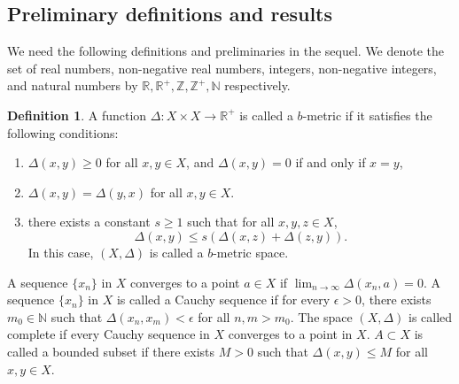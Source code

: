 \documentclass{birkjour}
\theoremstyle{definition}
\newtheorem{defn}[thm]{Definition}
\theoremstyle{remark}
\numberwithin{equation}{section}
\begin{document}
\subsection{Preliminary definitions and results}\label{pre-res}
We need the following definitions and preliminaries in the sequel. We denote the set of real numbers, non-negative real numbers, integers, non-negative integers, and natural numbers by $\mathbb{R},\mathbb{R}^{+}, \mathbb{Z}, \mathbb{Z}^{+}, \mathbb{N}$ respectively.\\  
\begin{defn}\label{metrics}
A function \(\Delta: X \times X \to \mathbb{R}^{+}\) is called a \(b\)-metric  if it satisfies the following conditions:
\begin{enumerate}
    \item \(\Delta(x, y) \geq 0\) for all \(x, y \in X\), and \(\Delta(x, y) = 0\) if and only if \(x = y\),
    \item \(\Delta(x, y) = \Delta(y, x)\) for all \(x, y \in X\).
    \item there exists a constant \(s \geq 1\) such that for all \(x, y, z \in X\),
    \[
    \Delta(x, y) \leq s \left( \Delta(x, z) + \Delta(z, y) \right).
    \]
    In this case, \((X, \Delta)\) is called a \(b\)-metric space.  
\end{enumerate}
A sequence \(\{x_n\}\) in \(X\) converges to a point \(a \in X\) if \(\lim_{n \to \infty} \Delta(x_n, a) = 0\). A sequence \(\{x_n\}\) in \(X\) is called a Cauchy sequence if for every \(\epsilon > 0\), there exists \(m_0 \in \mathbb{N}\) such that \(\Delta(x_n, x_m) < \epsilon\) for all \(n, m > m_0\). The space \((X, \Delta)\) is called complete if every Cauchy sequence in \(X\) converges to a point in \(X\). $A\subset X$ is called a bounded subset if there exists $M>0$ such that $\Delta(x,y)\leq M$ for all $x,y\in X$.
\end{defn}
\end{document}
